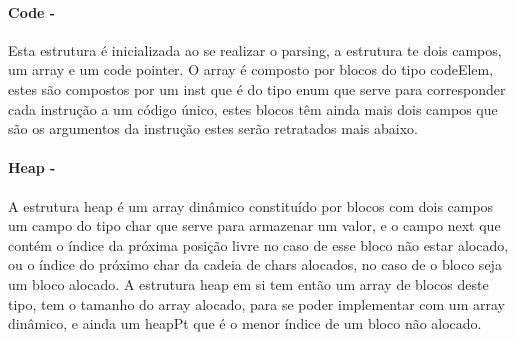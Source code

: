 \documentclass{report}
\begin{document}
\paragraph{\quad Code - } Esta estrutura é inicializada ao se realizar o parsing, a estrutura te dois campos,
 um array e um code pointer. O array é composto por blocos do tipo codeElem, estes são compostos por um
 inst que é do tipo enum que serve para corresponder cada instrução a um código único, estes blocos têm ainda
	mais dois campos que são os argumentos da instrução estes serão retratados mais abaixo.

\noindent
\par
\begin{Parallel}[v]{0.48\textwidth}{0.48\textwidth}
\ParallelPar
\end{Parallel}

\paragraph{\quad Heap - } A estrutura heap é um array dinâmico constituído por blocos com dois campos um campo do
 tipo char que serve para armazenar um valor, e o campo next que contém o índice da próxima posição livre no
 caso de esse bloco não estar alocado, ou o índice do próximo char da cadeia de chars alocados, no caso de
 o bloco seja um bloco alocado. A estrutura heap em si tem então um array de blocos deste tipo, tem o tamanho
 do array alocado, para se poder implementar com um array dinâmico, e ainda um heapPt que é o menor índice de um bloco não alocado.

\noindent
\par
\begin{Parallel}[v]{0.48\textwidth}{0.48\textwidth}
\ParallelPar
\end{Parallel}
\end{document}
